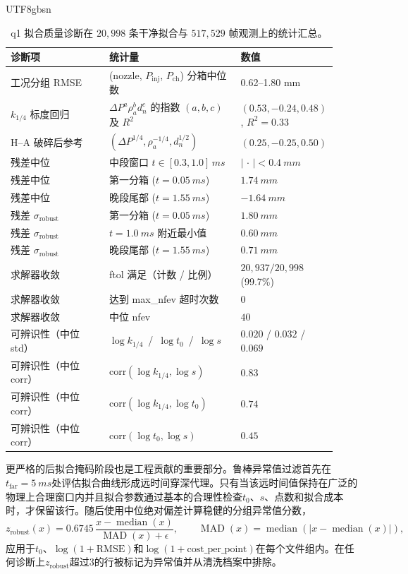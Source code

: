 \documentclass[english, 12pt, a4paper, elec, utf8, a-2b, online]{aaltothesis}
\begin{document}
\begin{CJK*}{UTF8}{gbsn}
\begin{table}[t]
\centering
\caption{q1 拟合质量诊断在 \(20{,}998\) 条干净拟合与 \(517{,}529\) 帧观测上的统计汇总。}
\label{tab:q1-fit-diagnostics-summary}
\small
\begin{tabular}{p{0.30\linewidth} p{0.40\linewidth} p{0.22\linewidth}}
\toprule
\textbf{诊断项} & \textbf{统计量} & \textbf{数值} \\
\midrule
工况分组 RMSE & (nozzle, $P_{\mathrm{inj}}$, $P_{\mathrm{ch}}$) 分箱中位数 & 0.62--1.80 mm \\
\midrule
$k_{1/4}$ 标度回归 & $\Delta P^a \rho_a^b d_n^c$ 的指数 $(a,b,c)$ 及 $R^2$ & $(0.53, -0.24, 0.48)$, $R^2=0.33$ \\
H--A 破碎后参考 & $(\Delta P^{1/4}, \rho_a^{-1/4}, d_n^{1/2})$ & $(0.25, -0.25, 0.50)$ \\
\midrule
残差中位 & 中段窗口 $t\in[0.3, 1.0]\,\si{ms}$ & $|\,\cdot\,| < \SI{0.4}{mm}$ \\
残差中位 & 第一分箱 ($t=\SI{0.05}{ms}$) & $\SI{+1.74}{mm}$ \\
残差中位 & 晚段尾部 ($t=\SI{1.55}{ms}$) & $\SI{-1.64}{mm}$ \\
残差 $\sigma_{\mathrm{robust}}$ & 第一分箱 ($t=\SI{0.05}{ms}$) & $\SI{1.80}{mm}$ \\
残差 $\sigma_{\mathrm{robust}}$ & $t=\SI{1.0}{ms}$ 附近最小值 & $\SI{0.60}{mm}$ \\
残差 $\sigma_{\mathrm{robust}}$ & 晚段尾部 ($t=\SI{1.55}{ms}$) & $\SI{0.71}{mm}$ \\
\midrule
求解器收敛 & ftol 满足（计数 / 比例） & $20{,}937 / 20{,}998$ (99.7\%) \\
求解器收敛 & 达到 max\_nfev 超时次数 & $0$ \\
求解器收敛 & 中位 nfev & $40$ \\
\midrule
可辨识性（中位 std） & $\log k_{1/4}$ \,/\, $\log t_0$ \,/\, $\log s$ & $0.020$ / $0.032$ / $0.069$ \\
可辨识性（中位 corr） & $\mathrm{corr}(\log k_{1/4}, \log s)$ & $0.83$ \\
可辨识性（中位 corr） & $\mathrm{corr}(\log k_{1/4}, \log t_0)$ & $0.74$ \\
可辨识性（中位 corr） & $\mathrm{corr}(\log t_0, \log s)$ & $0.45$ \\
\bottomrule
\end{tabular}
\end{table}

更严格的后拟合掩码阶段也是工程贡献的重要部分。鲁棒异常值过滤首先在\(t_{\mathrm{far}}=\SI{5}{ms}\)处评估拟合曲线形成远时间穿深代理。只有当该远时间值保持在广泛的物理上合理窗口内并且拟合参数通过基本的合理性检查\(t_0\)、\(s\)、点数和拟合成本时，才保留该行。随后使用中位绝对偏差计算稳健的分组异常值分数，
\[
z_{\mathrm{robust}}(x)=0.6745\,\frac{x-\operatorname{median}(x)}{\operatorname{MAD}(x)+\epsilon},
\qquad
\operatorname{MAD}(x)=\operatorname{median}\!\left(\lvert x-\operatorname{median}(x)\rvert\right),
\]
应用于\(t_0\)、\(\log(1+\mathrm{RMSE})\)和\(\log(1+\mathrm{cost\_per\_point})\)在每个文件组内。在任何诊断上\(z_{\mathrm{robust}}\)超过3的行被标记为异常值并从清洗档案中排除。


\end{CJK*}
\end{document}
